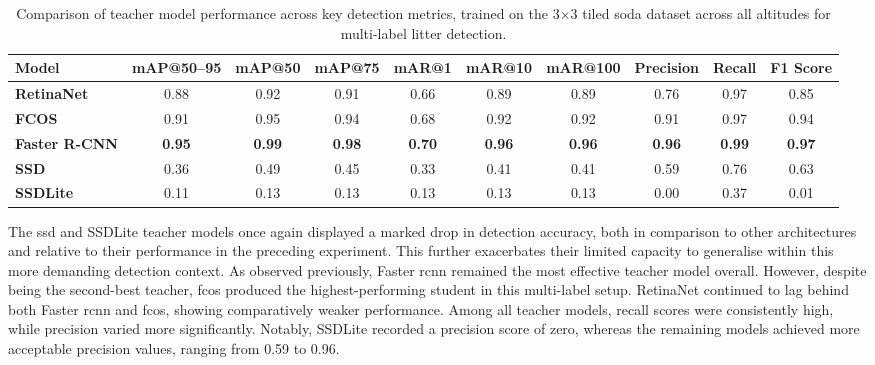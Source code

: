 \begin{table}[!ht]
    \centering
    \begin{adjustbox}{max width=\textwidth}
    \renewcommand{\arraystretch}{1.5}
    \begin{tabular}{|l|c|c|c|c|c|c|c|c|c|}
        \hline
        \textbf{Model} & \textbf{mAP@50--95} & \textbf{mAP@50} & \textbf{mAP@75} & \textbf{mAR@1} & \textbf{mAR@10} & \textbf{mAR@100} & \textbf{Precision} & \textbf{Recall} & \textbf{F1 Score} \\ \hline \hline
        \textbf{RetinaNet} & 0.88 & 0.92 & 0.91 & 0.66 & 0.89 & 0.89 & 0.76 & 0.97 & 0.85 \\\hline
        \textbf{FCOS} & 0.91 & 0.95 & 0.94 & 0.68 & 0.92 & 0.92 & 0.91 & 0.97 & 0.94 \\\hline
        \textbf{Faster R-CNN} & \textbf{0.95} & \textbf{0.99} & \textbf{0.98} & \textbf{0.70} & \textbf{0.96} & \textbf{0.96} & \textbf{0.96} & \textbf{0.99} & \textbf{0.97} \\\hline
        \textbf{SSD} & 0.36 & 0.49 & 0.45 & 0.33 & 0.41 & 0.41 & 0.59 & 0.76 & 0.63 \\\hline
        \textbf{SSDLite} & 0.11 & 0.13 & 0.13 & 0.13 & 0.13 & 0.13 & 0.00 & 0.37 & 0.01 \\
        \hline
    \end{tabular}
    \renewcommand{\arraystretch}{1}
    \end{adjustbox}
    \caption{Comparison of teacher model performance across key detection metrics, trained on the 3$\times$3 tiled \gls{soda} dataset across all altitudes for multi-label litter detection.}
    \label{tab:teacher_model_metrics_soda_tiled_multi}
\end{table}
 
The \gls{ssd} and SSDLite teacher models once again displayed a marked drop in detection accuracy, both in comparison to other architectures and relative to their performance in the preceding experiment. This further exacerbates their limited capacity to generalise within this more demanding detection context. As observed previously, Faster \gls{rcnn} remained the most effective teacher model overall. However, despite being the second-best teacher, \gls{fcos} produced the highest-performing student in this multi-label setup. RetinaNet continued to lag behind both Faster \gls{rcnn} and \gls{fcos}, showing comparatively weaker performance.
Among all teacher models, recall scores were consistently high, while precision varied more significantly. Notably, SSDLite recorded a precision score of zero, whereas the remaining models achieved more acceptable precision values, ranging from 0.59 to 0.96.

